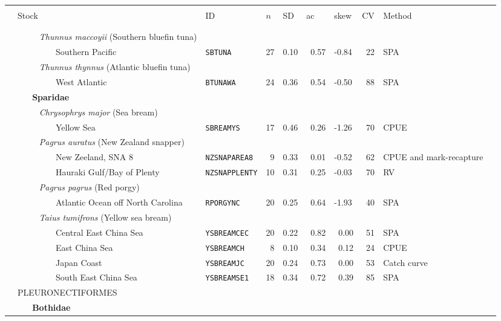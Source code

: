 \begin{flushleft}
\begin{tabular*}{7.1in}{llllllllll} 
\hline \\ 
&{\normalsize Stock}&{\normalsize ID}&{\normalsize $n$}&{\normalsize SD}&{\normalsize ac}&{\normalsize skew}&{\normalsize CV}&{\normalsize Method}  & \\ 
 &&&&&&&&&\\ 
  \hline  &&&&&&&&&\\ 
&{\it~~~~~Thunnus maccoyii} (Southern bluefin tuna)&~&~&~&~&~&~&~  & \\ 
&~~~~~~~~~Southern Pacific&{\tt SBTUNA}&27&0.10&~0.57&-0.84&~22&SPA  & \\ 
&{\it~~~~~Thunnus thynnus} (Atlantic bluefin tuna)&~&~&~&~&~&~&~  & \\ 
&~~~~~~~~~West Atlantic&{\tt BTUNAWA}&24&0.36&~0.54&-0.50&~88&SPA  & \\ 
&{\bf~~~Sparidae}&~&~&~&~&~&~&~  & \\ 
&{\it~~~~~Chrysophrys major} (Sea bream)&~&~&~&~&~&~&~  & \\ 
&~~~~~~~~~Yellow Sea&{\tt SBREAMYS}&17&0.46&~0.26&-1.26&~70&CPUE  & \\ 
&{\it~~~~~Pagrus auratus} (New Zealand snapper)&~&~&~&~&~&~&~  & \\ 
&~~~~~~~~~New Zeeland, SNA 8&{\tt NZSNAPAREA8}&~9&0.33&~0.01&-0.52&~62&CPUE and mark-recapture  & \\ 
&~~~~~~~~~Hauraki Gulf/Bay of Plenty&{\tt NZSNAPPLENTY}&10&0.31&~0.25&-0.03&~70&RV  & \\ 
&{\it~~~~~Pagrus pagrus} (Red porgy)&~&~&~&~&~&~&~  & \\ 
&~~~~~~~~~Atlantic Ocean off North Carolina&{\tt RPORGYNC}&20&0.25&~0.64&-1.93&~40&SPA  & \\ 
&{\it~~~~~Taius tumifrons} (Yellow sea bream)&~&~&~&~&~&~&~  & \\ 
&~~~~~~~~~Central East China Sea&{\tt YSBREAMCEC}&20&0.22&~0.82&~0.00&~51&SPA  & \\ 
&~~~~~~~~~East China Sea&{\tt YSBREAMCH}&~8&0.10&~0.34&~0.12&~24&CPUE  & \\ 
&~~~~~~~~~Japan Coast&{\tt YSBREAMJC}&20&0.24&~0.73&~0.00&~53&Catch curve  & \\ 
&~~~~~~~~~South East China Sea&{\tt YSBREAMSE1}&18&0.34&~0.72&~0.39&~85&SPA  & \\ 
&{\normalsize PLEURONECTIFORMES}&~&~&~&~&~&~&~  & \\ 
&{\bf~~~Bothidae}&~&~&~&~&~&~&~  & \\ 

\end{tabular*}
\end{flushleft}

